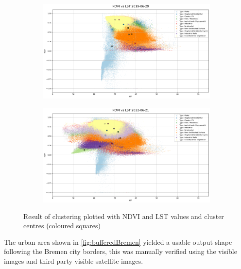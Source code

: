 \documentclass[12pt,a4paper, english,twoside]{scrartcl}
\begin{document}
      \begin{figure}[!htbp]
      \begin{subfigure}[b]{\textwidth}
        \centering
        \includegraphics[width=\textwidth]{img/NDVI vs LST 2019-06-29.png}
        \label{fig:ndvilst01}
      \end{subfigure}
      \begin{subfigure}[b]{\textwidth}
        \centering
        \includegraphics[width=\textwidth]{img/NDVI vs LST 2022-06-21.png}
        \label{fig:ndvilst02}
      \end{subfigure}
      \caption{Result of clustering plotted with \gls{NDVI} and \gls{LST} values and cluster centres (coloured squares)\label{fig:kmeansclusters}}
      \end{figure}
      \noindent
      The urban area shown in \cref{fig:bufferedBremen} yielded a usable output shape following the Bremen city borders, this was manually verified using the visible images and third party visible satellite images. 
\end{document}
